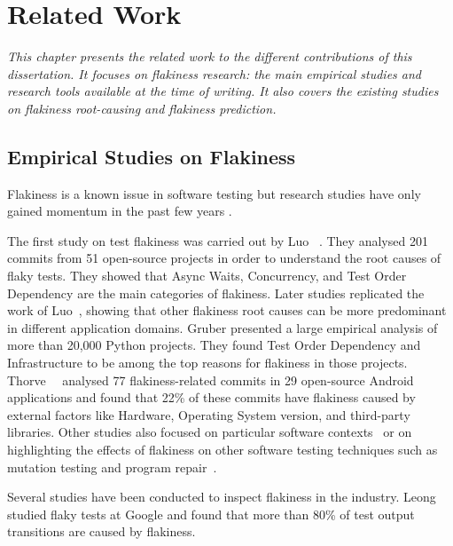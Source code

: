 \chapter{Related Work}
\label{chap:related-work}

\setcounter{minitocdepth}{1}
\justifying
\textit{
This chapter presents the related work to the different contributions of this dissertation. It focuses on flakiness research: the main empirical studies and research tools available at the time of writing. It also covers the existing studies on flakiness root-causing and flakiness prediction.
}

\chapterPage{
}

\section{Empirical Studies on Flakiness}

Flakiness is a known issue in software testing but research studies have only gained momentum in the past few years \cite{Parry2021}.

The first study on test flakiness was carried out by Luo \etal~\cite{Luo2014}. 
They analysed 201 commits from 51 open-source projects in order to understand the root causes of flaky tests.
They showed that Async Waits, Concurrency, and Test Order Dependency are the main categories of flakiness.
Later studies replicated the work of Luo~\etal, showing that other flakiness root causes can be more predominant in different application domains. Gruber \etal \cite{Gruber2021} presented a large empirical analysis of more than 20,000 Python projects. They found Test Order Dependency and Infrastructure to be among the top reasons for flakiness in those projects.
Thorve~\etal~\cite{Thorve2018} analysed 77 flakiness-related commits in 29 open-source Android applications and found that 22\% of these commits have flakiness caused by external factors like Hardware, Operating System version, and third-party libraries. Other studies also focused on particular software contexts~\cite{romano2021empirical,memon2013automated,hashemi2022empirical} or on highlighting the effects of flakiness on other software testing techniques such as mutation testing and program repair~\cite{Cordy2019,Shi2019,Qin2021}.

Several studies have been conducted to inspect flakiness in the industry.
Leong \etal~\cite{LeongSPTM19} studied flaky tests at Google and found that more than 80\% of test output transitions are caused by flakiness. 

